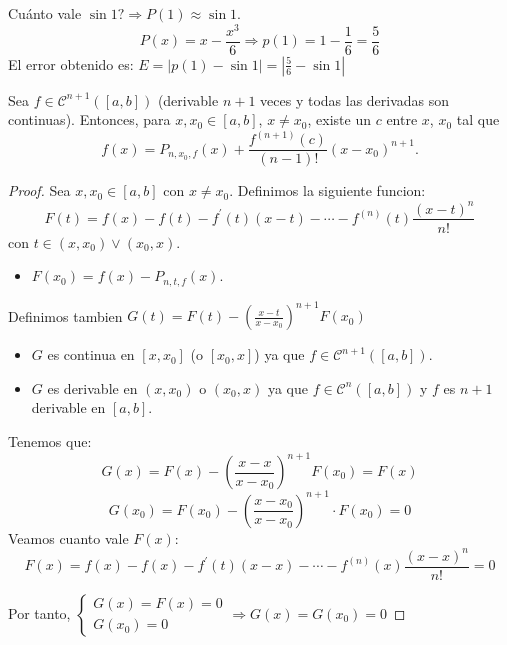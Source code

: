 Cuánto vale \(\sin 1 ? \Rightarrow P(1) \approx \sin 1\).
\[
	P(x) = x - \frac{x^{3} }{6} \Rightarrow p(1) = 1 - \frac{1}{6} = \frac{5}{6}
\]
El error obtenido es: \(E = \left\vert p(1) - \sin 1 \right\vert = \left\vert \frac{5}{6} - \sin 1 \right\vert \)
\begin{theorem}
	Sea \(f \in \mathscr{C}^{n + 1} ([a,b])\) (derivable \(n+ 1 \) veces y todas las derivadas son continuas). Entonces, para \(x, x_0 \in [a,b ]\), \(x \neq x_0 \), existe un \(c \) entre \(x \), \(x_0 \) tal que
	\[
		f(x) = P_{n,x_0,f}(x) + \frac{f^{(n+1)}(c) }{(n-1)!}(x - x_0)^{n+1}.
	\]
\end{theorem}
\begin{proof}
	Sea \(x, x_0 \in [a,b ]\) con \(x \neq  x_0 \). Definimos la siguiente funcion:
	\[
		F(t) = f(x) - f(t) - f^\prime (t) (x - t) - \cdots - f^{(n)}(t) \frac{(x - t)^{n} }{n!}
	\]
	con \(t \in (x, x_0) \vee (x_0, x )\).
	\begin{itemize}
		\item \(F(x_0) = f(x) - P_{n,t,f}(x)\).
	\end{itemize}
	Definimos tambien \(G(t) = F(t) - (\frac{x - t }{x - x_0 })^{n+1} F(x_0) \)
	\begin{itemize}
		\item \(G \) es continua en \([x,x_0 ]\) (o \([x_0, x]\)) ya que \(f \in \mathscr{C}^{n+1}([a,b 	]) \).
		\item \(G \) es derivable en \((x, x_0)\) o \((x_0, x )\) ya que \(f \in \mathscr{C}^{n}([a,b])  \) y \(f \) es \(n+ 1 \) derivable en \([a,b ]\).
	\end{itemize}
	Tenemos que:
	\[
		G(x) = F(x) - (\frac{x - x }{x - x_0})^{n + 1} F(x_0) = F(x)
	\]
	\[
		G(x_0) = F(x_0) - (\frac{x - x_0 }{x - x_0 })^{n + 1} \cdot F(x_0) = 0
	\]
	Veamos cuanto vale \(F(x )\):
	\[
		F(x) = f(x) - f(x) - f^\prime (t) (x - x) - \cdots - f^{(n)}(x) \frac{(x -x)^{n} }{n!} = 0
	\]

	Por tanto, \(\begin{cases}
		G(x) = F(x) = 0 \\
		G(x_0) = 0
	\end{cases}\Rightarrow G(x) = G(x_0) = 0\)


\end{proof}
